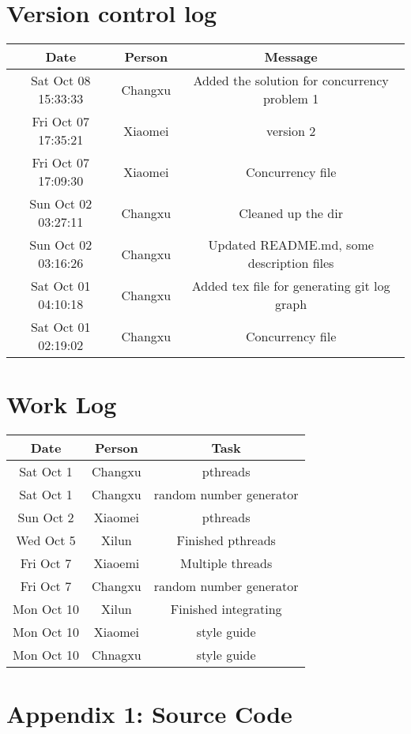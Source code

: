 \documentclass[letterpaper,10pt]{article}
\begin{document}
\section{Version control log}
\begin{tabular}{@{}ccc@{}}
    \toprule
    Date                & Person   & Message                                                   \\ \midrule
    Sat Oct 08 15:33:33 & Changxu  & Added the solution for concurrency problem 1              \\
    Fri Oct 07 17:35:21 & Xiaomei  & version 2                                                 \\
    Fri Oct 07 17:09:30 & Xiaomei  & Concurrency file                                          \\
    Sun Oct 02 03:27:11 & Changxu  & Cleaned up the dir                                        \\
    Sun Oct 02 03:16:26 & Changxu  & Updated README.md, some description files                 \\
    Sat Oct 01 04:10:18 & Changxu  & Added tex file for generating git log graph               \\
    Sat Oct 01 02:19:02 & Changxu  & Concurrency file                                          \\ \bottomrule
\end{tabular}

\section{Work Log}
\begin{tabular}{@{}ccc@{}}
    \toprule
    Date                & Person   & Task                                                      \\ \midrule
    Sat Oct 1           & Changxu  & pthreads                                                  \\
    Sat Oct 1           & Changxu  & random number generator                                   \\
    Sun Oct 2           & Xiaomei  & pthreads                                                  \\
    Wed Oct 5           & Xilun    & Finished pthreads                                         \\
    Fri Oct 7           & Xiaoemi  & Multiple threads                                          \\
    Fri Oct 7           & Changxu  & random number generator                                   \\
    Mon Oct 10          & Xilun    & Finished integrating                                      \\
    Mon Oct 10          & Xiaomei  & style guide                                               \\
    Mon Oct 10          & Chnagxu  & style guide                                               \\ \bottomrule
\end{tabular}



\section*{Appendix 1: Source Code}

\end{document}
